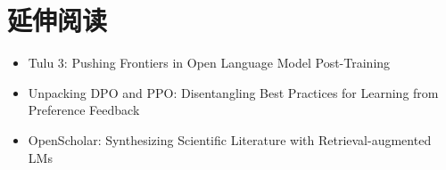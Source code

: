 \documentclass[a4paper]{article}
\begin{document}
\section{延伸阅读}
\begin{itemize}
\item Tulu 3: Pushing Frontiers in Open Language Model Post-Training
\item Unpacking DPO and PPO: Disentangling Best Practices for Learning from Preference Feedback
\item OpenScholar: Synthesizing Scientific Literature with Retrieval-augmented LMs
\end{itemize}
\end{document}
